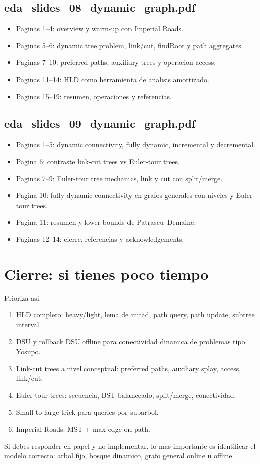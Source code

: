 \documentclass[10pt]{article}
\begin{document}
\subsection*{eda\_slides\_08\_dynamic\_graph.pdf}
\begin{itemize}[leftmargin=*]
\item Paginas 1--4: overview y warm-up con Imperial Roads.
\item Paginas 5--6: dynamic tree problem, link/cut, findRoot y path aggregates.
\item Paginas 7--10: preferred paths, auxiliary trees y operacion access.
\item Paginas 11--14: HLD como herramienta de analisis amortizado.
\item Paginas 15--19: resumen, operaciones y referencias.
\end{itemize}

\subsection*{eda\_slides\_09\_dynamic\_graph.pdf}
\begin{itemize}[leftmargin=*]
\item Paginas 1--5: dynamic connectivity, fully dynamic, incremental y
decremental.
\item Pagina 6: contraste link-cut trees vs Euler-tour trees.
\item Paginas 7--9: Euler-tour tree mechanics, link y cut con split/merge.
\item Pagina 10: fully dynamic connectivity en grafos generales con niveles y
Euler-tour trees.
\item Pagina 11: resumen y lower bounds de Patrascu--Demaine.
\item Paginas 12--14: cierre, referencias y acknowledgements.
\end{itemize}



\section*{Cierre: si tienes poco tiempo}
Prioriza asi:
\begin{enumerate}[leftmargin=*]
\item HLD completo: heavy/light, lema de mitad, path query, path update,
subtree interval.
\item DSU y rollback DSU offline para conectividad dinamica de problemas tipo
Yosupo.
\item Link-cut trees a nivel conceptual: preferred paths, auxiliary splay,
access, link/cut.
\item Euler-tour trees: secuencia, BST balanceado, split/merge, conectividad.
\item Small-to-large trick para queries por subarbol.
\item Imperial Roads: MST + max edge on path.
\end{enumerate}

Si debes responder en papel y no implementar, lo mas importante es identificar
el modelo correcto: arbol fijo, bosque dinamico, grafo general online u offline.
\end{document}
